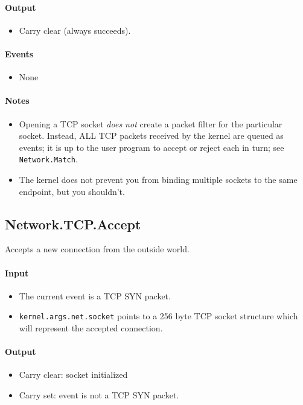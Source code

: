 \paragraph{Output}
\begin{itemize}
\item Carry clear (always succeeds).
\end{itemize}

\paragraph{Events}
\begin{itemize}
\item None
\end{itemize}

\paragraph{Notes}
\begin{itemize}
\item Opening a TCP socket {\em does not} create a packet filter for the particular socket.  Instead, ALL TCP packets received by the kernel are queued as events; it is up to the user program to accept or reject each in turn; see \verb+Network.Match+.
\item The kernel does not prevent you from binding multiple sockets to the same endpoint, but you shouldn't.
\end{itemize}

\subsection*{Network.TCP.Accept}
Accepts a new connection from the outside world.

\paragraph{Input}
\begin{itemize}
\item The current event is a TCP SYN packet.
\item \verb+kernel.args.net.socket+ points to a 256 byte TCP socket structure which will represent the accepted connection.
\end{itemize}

\paragraph{Output}
\begin{itemize}
\item Carry clear: socket initialized
\item Carry set: event is not a TCP SYN packet.
\end{itemize}

